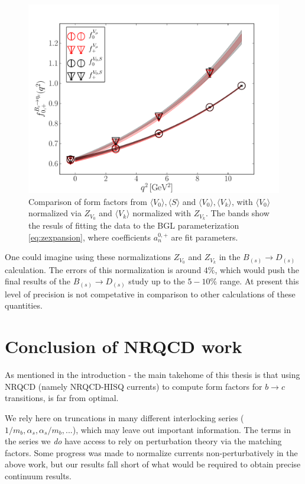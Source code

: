 \begin{figure}[htb!]
\centering
\includegraphics[scale=0.55]{images/nrqcd/Bcetac_bothways_3.pdf}
\caption{Comparison of form factors from $\langle V_0 \rangle, \langle S \rangle$ and $\langle V_0 \rangle,\langle V_k \rangle$, with $\langle V_0 \rangle$ normalized via $Z_{V_0}$ and $\langle V_k \rangle$ normalized with $Z_{V_k}$. The bands show the resuls of fitting the data to the BGL parameterization \eqref{eq:zexpansion}, where coefficients $a^{0,+}_n$ are fit parameters. \label{fig:identicle}}
\end{figure}

One could imagine using these normalizations $Z_{V_0}$ and $Z_{V_k}$ in the $B_{(s)}\to D_{(s)}$ calculation. The errors of this normalization is around $4\%$, which would push the final results of the $B_{(s)}\to D_{(s)}$ study up to the $5-10\%$ range. At present this level of precision is not competative in comparison to other calculations of these quantities.

\section{Conclusion of NRQCD work}

As mentioned in the introduction - the main takehome of this thesis is that using NRQCD (namely NRQCD-HISQ currents) to compute form factors for $b\to c$ transitions, is far from optimal. 

We rely here on truncations in many different interlocking series ($1/m_b, \alpha_s,\alpha_s/m_b,...$), which may leave out important information. The terms in the series we {\textit{do}} have access to rely on perturbation theory via the matching factors. Some progress was made to normalize currents non-perturbatively in the above work, but our results fall short of what would be required to obtain precise continuum results.


